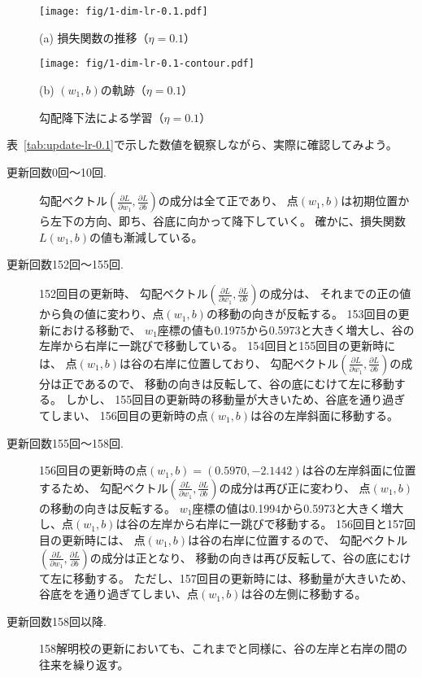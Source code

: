 \begin{figure}

  \texttt{[image: fig/1-dim-lr-0.1.pdf]}

  (a) 損失関数の推移（$\eta = 0.1$）
  
  \texttt{[image: fig/1-dim-lr-0.1-contour.pdf]}

  (b) $(w_1, b)$の軌跡（$\eta = 0.1$）
  
  \caption{勾配降下法による学習（$\eta = 0.1$）}
  \label{fig:grad-descent-0.1}
\end{figure}

表~\ref{tab:update-lr-0.1}で示した数値を観察しながら、実際に確認してみよう。
\begin{description}
\item[更新回数0回〜10回.]
  勾配ベクトル$(\frac{\partial L}{\partial w_1}, \frac{\partial L}{\partial b})$の成分は全て正であり、
  点$(w_1, b)$は初期位置から左下の方向、即ち、谷底に向かって降下していく。
  確かに、損失関数$L(w_1, b)$の値も漸減している。
\item[更新回数152回〜155回.]
  152回目の更新時、
  勾配ベクトル$(\frac{\partial L}{\partial w_1}, \frac{\partial L}{\partial b})$の成分は、
  それまでの正の値から負の値に変わり、点$(w_1, b)$の移動の向きが反転する。
  153回目の更新における移動で、
  $w_1$座標の値も0.1975から0.5973と大きく増大し、谷の左岸から右岸に一跳びで移動している。
  154回目と155回目の更新時には、
  点$(w_1, b)$は谷の右岸に位置しており、
  勾配ベクトル$(\frac{\partial L}{\partial w_1}, \frac{\partial L}{\partial b})$の成分は正であるので、
  移動の向きは反転して、谷の底にむけて左に移動する。
  しかし、
  155回目の更新時の移動量が大きいため、谷底を通り過ぎてしまい、
  156回目の更新時の点$(w_1, b)$は谷の左岸斜面に移動する。
\item[更新回数155回〜158回.]
  156回目の更新時の点$(w_1, b) = (0.5970, -2.1442)$は谷の左岸斜面に位置するため、
  勾配ベクトル$(\frac{\partial L}{\partial w_1}, \frac{\partial L}{\partial b})$の成分は再び正に変わり、
  点$(w_1, b)$の移動の向きは反転する。
  $w_1$座標の値は0.1994から0.5973と大きく増大し、点$(w_1, b)$は谷の左岸から右岸に一跳びで移動する。
  156回目と157回目の更新時には、
  点$(w_1, b)$は谷の右岸に位置するので、
  勾配ベクトル$(\frac{\partial L}{\partial w_1}, \frac{\partial L}{\partial b})$の成分は正となり、
  移動の向きは再び反転して、谷の底にむけて左に移動する。
  ただし、157回目の更新時には、移動量が大きいため、谷底をを通り過ぎてしまい、点$(w_1, b)$は谷の左側に移動する。
\item[更新回数158回以降.]
  158解明校の更新においても、これまでと同様に、谷の左岸と右岸の間の往来を繰り返す。
\end{description}

